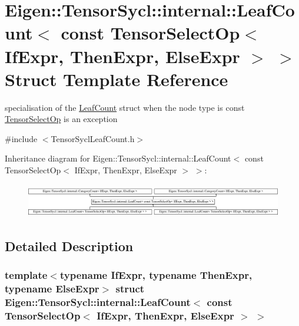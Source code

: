 \hypertarget{struct_eigen_1_1_tensor_sycl_1_1internal_1_1_leaf_count_3_01const_01_tensor_select_op_3_01_if_ex72978f23c8cb9bf12d74a334fc0db28e}{}\section{Eigen\+:\+:Tensor\+Sycl\+:\+:internal\+:\+:Leaf\+Count$<$ const Tensor\+Select\+Op$<$ If\+Expr, Then\+Expr, Else\+Expr $>$ $>$ Struct Template Reference}
\label{struct_eigen_1_1_tensor_sycl_1_1internal_1_1_leaf_count_3_01const_01_tensor_select_op_3_01_if_ex72978f23c8cb9bf12d74a334fc0db28e}


specialisation of the \hyperlink{struct_eigen_1_1_tensor_sycl_1_1internal_1_1_leaf_count}{Leaf\+Count} struct when the node type is const \hyperlink{class_eigen_1_1_tensor_select_op}{Tensor\+Select\+Op} is an exception  




{\ttfamily \#include $<$Tensor\+Sycl\+Leaf\+Count.\+h$>$}

Inheritance diagram for Eigen\+:\+:Tensor\+Sycl\+:\+:internal\+:\+:Leaf\+Count$<$ const Tensor\+Select\+Op$<$ If\+Expr, Then\+Expr, Else\+Expr $>$ $>$\+:\begin{figure}[H]
\begin{center}
\leavevmode
\includegraphics[height=1.492007cm]{struct_eigen_1_1_tensor_sycl_1_1internal_1_1_leaf_count_3_01const_01_tensor_select_op_3_01_if_ex72978f23c8cb9bf12d74a334fc0db28e}
\end{center}
\end{figure}


\subsection{Detailed Description}
\subsubsection*{template$<$typename If\+Expr, typename Then\+Expr, typename Else\+Expr$>$\newline
struct Eigen\+::\+Tensor\+Sycl\+::internal\+::\+Leaf\+Count$<$ const Tensor\+Select\+Op$<$ If\+Expr, Then\+Expr, Else\+Expr $>$ $>$}

